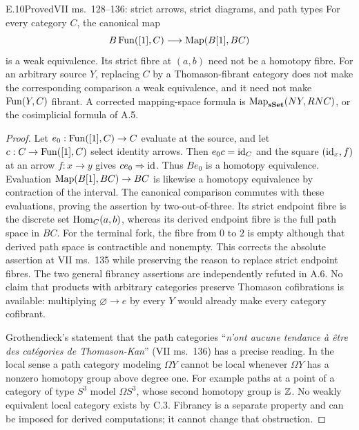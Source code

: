 \begin{claim}{E.10}{Proved}{VII ms.~128--136: strict arrows, strict diagrams, and path types}
For every category $C$, the canonical map
\[
 B\operatorname{Fun}([1],C)\longrightarrow\operatorname{Map}(B[1],BC)
\]
is a weak equivalence. Its strict fibre at $(a,b)$ need not be a homotopy fibre. For an arbitrary source $Y$, replacing $C$ by a Thomason-fibrant category does not make the corresponding comparison a weak equivalence, and it need not make $\operatorname{Fun}(Y,C)$ fibrant. A corrected mapping-space formula is $\operatorname{Map}_{\mathbf{sSet}}(NY,RNC)$, or the cosimplicial formula of A.5.
\end{claim}
\begin{proof}
Let $e_0:\operatorname{Fun}([1],C)\to C$ evaluate at the source, and let $c:C\to\operatorname{Fun}([1],C)$ select identity arrows. Then $e_0c=\mathrm{id}_C$ and the square $(\mathrm{id}_x,f)$ at an arrow $f:x\to y$ gives $ce_0\Rightarrow\mathrm{id}$. Thus $Be_0$ is a homotopy equivalence. Evaluation $\operatorname{Map}(B[1],BC)\to BC$ is likewise a homotopy equivalence by contraction of the interval. The canonical comparison commutes with these evaluations, proving the assertion by two-out-of-three. Its strict endpoint fibre is the discrete set $\operatorname{Hom}_C(a,b)$, whereas its derived endpoint fibre is the full path space in $BC$. For the terminal fork, the fibre from $0$ to $2$ is empty although that derived path space is contractible and nonempty. This corrects the absolute assertion at VII ms.~135 while preserving the reason to replace strict endpoint fibres. The two general fibrancy assertions are independently refuted in A.6. No claim that products with arbitrary categories preserve Thomason cofibrations is available: multiplying $\varnothing\to e$ by every $Y$ would already make every category cofibrant.

Grothendieck's statement that the path categories ``\emph{n'ont aucune tendance \`a \^etre des cat\'egories de Thomason-Kan}'' (VII ms.~136) has a precise reading. In the local sense a path category modeling $\Omega Y$ cannot be local whenever $\Omega Y$ has a nonzero homotopy group above degree one. For example paths at a point of a category of type $S^3$ model $\Omega S^3$, whose second homotopy group is $\mathbb Z$. No weakly equivalent local category exists by C.3. Fibrancy is a separate property and can be imposed for derived computations; it cannot change that obstruction.
\end{proof}

